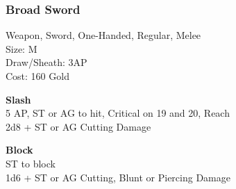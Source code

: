 \subsubsection{Broad Sword}\label{weapon:broadSword}
Weapon, Sword, One-Handed, Regular, Melee\\
Size: M\\
Draw/Sheath: 3AP\\
Cost: 160 Gold

\textbf{Slash}\\
5 AP, ST or AG to hit, Critical on 19 and 20,  Reach\\
2d8 + \texttimes ST or AG Cutting Damage

\textbf{Block}\\
ST to block\\
1d6 + \texttimes ST or AG Cutting, Blunt or Piercing Damage

